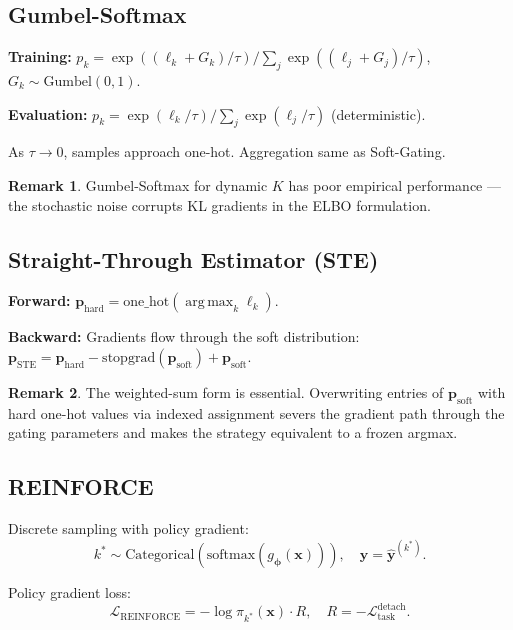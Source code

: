 \documentclass[11pt,a4paper]{article}
\theoremstyle{definition}
\newtheorem{remark}{Remark}[section]
\newcommand{\bx}{\mathbf{x}}
\newcommand{\by}{\mathbf{y}}
\newcommand{\bphi}{\boldsymbol{\phi}}
\newcommand{\softmax}{\mathrm{softmax}}
\DeclareMathOperator*{\argmax}{arg\,max}
\begin{document}
\subsection{Gumbel-Softmax}

\textbf{Training:}
$p_k = \exp((\ell_k + G_k) / \tau) / \sum_{j} \exp((\ell_j + G_j) / \tau)$,
$G_k \sim \text{Gumbel}(0, 1)$.

\textbf{Evaluation:}
$p_k = \exp(\ell_k / \tau) / \sum_{j} \exp(\ell_j / \tau)$ (deterministic).

As $\tau \to 0$, samples approach one-hot. Aggregation same as Soft-Gating.

\begin{remark}
Gumbel-Softmax for dynamic $K$ has poor empirical performance --- the
stochastic noise corrupts KL gradients in the ELBO formulation.
\end{remark}

\subsection{Straight-Through Estimator (STE)}

\textbf{Forward:}
$\mathbf{p}_{\mathrm{hard}} = \mathrm{one\_hot}(\argmax_k \ell_k)$.

\textbf{Backward:} Gradients flow through the soft distribution:
$\mathbf{p}_{\mathrm{STE}} = \mathbf{p}_{\mathrm{hard}} - \mathrm{stopgrad}(\mathbf{p}_{\mathrm{soft}}) + \mathbf{p}_{\mathrm{soft}}$.

\begin{remark}
The weighted-sum form is essential. Overwriting entries of
$\mathbf{p}_{\mathrm{soft}}$ with hard one-hot values via indexed assignment
severs the gradient path through the gating parameters and makes the
strategy equivalent to a frozen argmax.
\end{remark}

\subsection{REINFORCE}

Discrete sampling with policy gradient:
\[
  k^* \sim \mathrm{Categorical}(\softmax(g_\bphi(\bx))), \quad
  \hat{\by} = \hat{\by}^{(k^*)}.
\]

Policy gradient loss:
\begin{equation}
  \mathcal{L}_{\mathrm{REINFORCE}} = -\log \pi_{k^*}(\bx) \cdot R,
  \quad R = -\mathcal{L}_{\mathrm{task}}^{\mathrm{detach}}.
  \label{eq:reinforce}
\end{equation}
\end{document}
